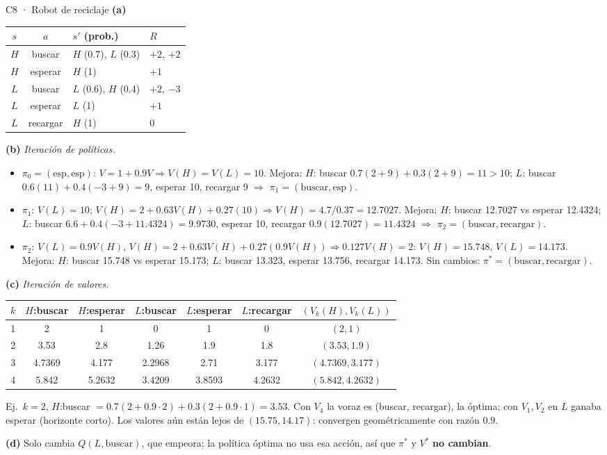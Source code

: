\begin{solucion}{C8 · Robot de reciclaje}
\textbf{(a)}
\begin{center}\small
\begin{tabular}{cc|ll}
\toprule
$s$ & $a$ & $s'$ (prob.) & $R$\\\midrule
$H$ & buscar & $H$ (0.7), $L$ (0.3) & $+2$, $+2$\\
$H$ & esperar & $H$ (1) & $+1$\\
$L$ & buscar & $L$ (0.6), $H$ (0.4) & $+2$, $-3$\\
$L$ & esperar & $L$ (1) & $+1$\\
$L$ & recargar & $H$ (1) & $0$\\\bottomrule
\end{tabular}
\end{center}

\textbf{(b)} \emph{Iteración de políticas.}
\begin{itemize}
\item $\pi_0=(\text{esp},\text{esp})$: $V=1+0.9V\Rightarrow V(H)=V(L)=10$. Mejora: $H$: buscar $0.7(2+9)+0.3(2+9)=11>10$; $L$: buscar $0.6(11)+0.4(-3+9)=9$,
esperar 10, recargar 9 $\Rightarrow$ $\pi_1=(\text{buscar},\text{esp})$.
\item $\pi_1$: $V(L)=10$; $V(H)=2+0.63V(H)+0.27(10)\Rightarrow V(H)=4.7/0.37=12.7027$. Mejora: $H$: buscar 12.7027 vs esperar 12.4324;
$L$: buscar $6.6+0.4(-3+11.4324)=9.9730$, esperar 10, recargar $0.9(12.7027)=11.4324$ $\Rightarrow$ $\pi_2=(\text{buscar},\text{recargar})$.
\item $\pi_2$: $V(L)=0.9V(H)$, $V(H)=2+0.63V(H)+0.27(0.9V(H))\Rightarrow0.127V(H)=2$: $V(H)=\mathbf{15.748}$, $V(L)=\mathbf{14.173}$. Mejora: $H$: buscar 15.748
vs esperar 15.173; $L$: buscar 13.323, esperar 13.756, recargar 14.173. Sin cambios: \textbf{$\pi^*=(\text{buscar},\text{recargar})$}.
\end{itemize}

\textbf{(c)} \emph{Iteración de valores.}
\begin{center}\small
\begin{tabular}{c|cc|ccc|c}
\toprule
$k$ & $H$:buscar & $H$:esperar & $L$:buscar & $L$:esperar & $L$:recargar & $(V_k(H),V_k(L))$\\\midrule
1 & 2 & 1 & 0 & 1 & 0 & $(2,1)$\\
2 & 3.53 & 2.8 & 1.26 & 1.9 & 1.8 & $(3.53,1.9)$\\
3 & 4.7369 & 4.177 & 2.2968 & 2.71 & 3.177 & $(4.7369,3.177)$\\
4 & 5.842 & 5.2632 & 3.4209 & 3.8593 & 4.2632 & $(5.842,4.2632)$\\\bottomrule
\end{tabular}
\end{center}
Ej.\ $k=2$, $H$:buscar $=0.7(2+0.9\cdot2)+0.3(2+0.9\cdot1)=3.53$. Con $V_4$ la voraz es (buscar, recargar), la óptima; con $V_1,V_2$ en $L$ ganaba esperar
(horizonte corto). Los valores aún están lejos de $(15.75,14.17)$: convergen geométricamente con razón $0.9$.

\textbf{(d)} Solo cambia $Q(L,\text{buscar})$, que empeora; la política óptima no usa esa acción, así que $\pi^*$ y $V^*$ \textbf{no cambian}.
\end{solucion}

